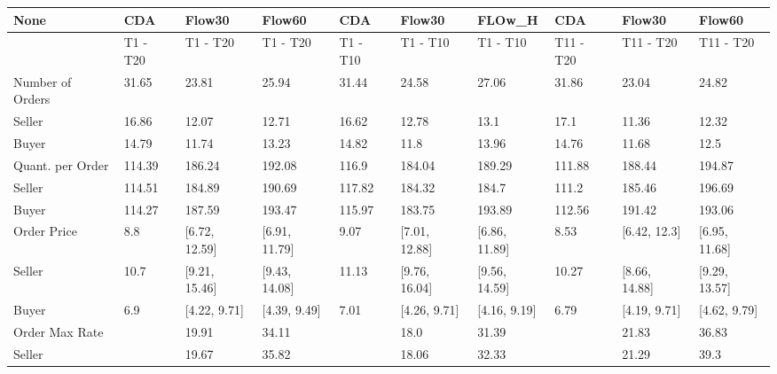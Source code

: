 \begin{tabular}{llllllllll}
\hline
 None                   & CDA      & Flow30        & Flow60        & CDA      & Flow30        & FLOw\_H        & CDA       & Flow30        & Flow60        \\
\hline
                        & T1 - T20 & T1 - T20      & T1 - T20      & T1 - T10 & T1 - T10      & T1 - T10      & T11 - T20 & T11 - T20     & T11 - T20     \\
 Number of Orders       & 31.65    & 23.81         & 25.94         & 31.44    & 24.58         & 27.06         & 31.86     & 23.04         & 24.82         \\
 Seller                 & 16.86    & 12.07         & 12.71         & 16.62    & 12.78         & 13.1          & 17.1      & 11.36         & 12.32         \\
 Buyer                  & 14.79    & 11.74         & 13.23         & 14.82    & 11.8          & 13.96         & 14.76     & 11.68         & 12.5          \\
 Quant. per Order       & 114.39   & 186.24        & 192.08        & 116.9    & 184.04        & 189.29        & 111.88    & 188.44        & 194.87        \\
 Seller                 & 114.51   & 184.89        & 190.69        & 117.82   & 184.32        & 184.7         & 111.2     & 185.46        & 196.69        \\
 Buyer                  & 114.27   & 187.59        & 193.47        & 115.97   & 183.75        & 193.89        & 112.56    & 191.42        & 193.06        \\
 Order Price            & 8.8      & [6.72, 12.59] & [6.91, 11.79] & 9.07     & [7.01, 12.88] & [6.86, 11.89] & 8.53      & [6.42, 12.3]  & [6.95, 11.68] \\
 Seller                 & 10.7     & [9.21, 15.46] & [9.43, 14.08] & 11.13    & [9.76, 16.04] & [9.56, 14.59] & 10.27     & [8.66, 14.88] & [9.29, 13.57] \\
 Buyer                  & 6.9      & [4.22, 9.71]  & [4.39, 9.49]  & 7.01     & [4.26, 9.71]  & [4.16, 9.19]  & 6.79      & [4.19, 9.71]  & [4.62, 9.79]  \\
 Order Max Rate         &          & 19.91         & 34.11         &          & 18.0          & 31.39         &           & 21.83         & 36.83         \\
 Seller                 &          & 19.67         & 35.82         &          & 18.06         & 32.33         &           & 21.29         & 39.3          \\

\end{tabular}
